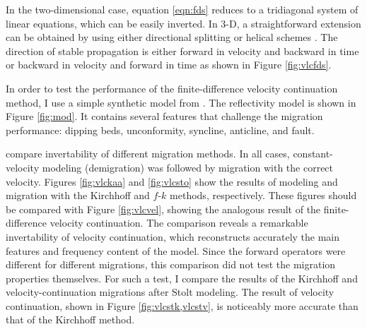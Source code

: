 
In the two-dimensional case, equation \ref{eqn:fds} reduces to a
tridiagonal system of linear equations, which can be easily inverted.
In 3-D, a straightforward extension can be obtained by using either
directional splitting or helical schemes \cite[]{SEG-1998-1124}. The
direction of stable propagation is either forward in velocity and
backward in time or backward in velocity and forward in time as shown
in Figure \ref{fig:vlcfds}.



In order to test the performance of the finite-difference velocity
continuation method, I use a simple synthetic model from
\cite{Claerbout.bei.95}. The reflectivity model is shown in
Figure \ref{fig:mod}. It contains several features that challenge the
migration performance: dipping beds, unconformity, syncline,
anticline, and fault. 


 compare invertability of different
migration methods. In all cases, constant-velocity modeling (demigration) 
was followed by migration with the correct velocity.  Figures
\ref{fig:vlckaa} and \ref{fig:vlcsto} show the results of modeling and
migration with the Kirchhoff \cite[]{GEO43-01-00490076} and $f$-$k$
\cite[]{GEO43-01-00230048} methods, respectively. These figures should
be compared with Figure \ref{fig:vlcvel}, showing the analogous result
of the finite-difference velocity continuation.  The comparison
reveals a remarkable invertability of velocity continuation, which
reconstructs accurately the main features and frequency content of the
model. Since the forward operators were different for different
migrations, this comparison did not test the migration properties
themselves. For such a test, I compare the results of the Kirchhoff
and velocity-continuation migrations after Stolt modeling.  The result
of velocity continuation, shown in Figure \ref{fig:vlcstk,vlcstv}, is
noticeably more accurate than that of the Kirchhoff method.

